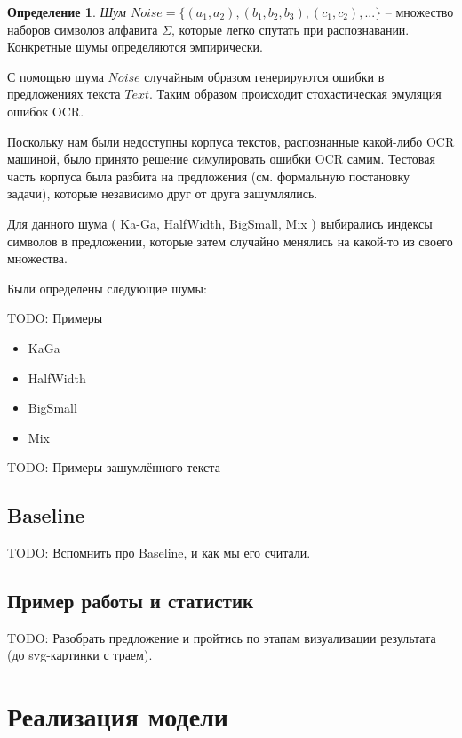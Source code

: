 \documentclass[14pt,russian]{extreport}
\theoremstyle{definition}
\newtheorem{definition}{Определение}[subsection]
\newcommand{\todo}[1]{}
\renewcommand{\todo}[1]{{\color{red} TODO: {#1}}}
\begin{document}
\begin{definition}
	{\textit{Шум $Noise = \{ (a_1, a_2), (b_1, b_2, b_3), (c_1, c_2), ... \}$}} -- множество наборов символов алфавита $\Sigma$, которые легко спутать при распознавании. Конкретные шумы определяются эмпирически. 
\end{definition}

С помощью шума $Noise$ случайным образом генерируются ошибки в предложениях текста $Text$. Таким образом происходит стохастическая эмуляция ошибок OCR.

Поскольку нам были недоступны корпуса текстов, распознанные какой-либо OCR машиной, было принято решение симулировать ошибки OCR самим. Тестовая часть корпуса была разбита на предложения (см. формальную постановку задачи), которые независимо друг от друга зашумлялись.

Для данного шума ( Ka-Ga, HalfWidth, BigSmall, Mix ) выбирались индексы символов в предложении, которые затем случайно менялись на какой-то из своего множества.

Были определены следующие шумы: 

\todo{Примеры}

\begin{itemize}
	\item KaGa 

	\item HalfWidth

	\item BigSmall

	\item Mix
\end{itemize}

\todo{Примеры зашумлённого текста}

\subsection{ Baseline }

\todo{Вспомнить про Baseline, и как мы его считали.}

\subsection{ Пример работы и статистик }

\todo{ Разобрать предложение и пройтись по этапам визуализации результата (до svg-картинки с траем). }

\newpage
\section{ Реализация модели }\label{sec:coding}
\end{document}
